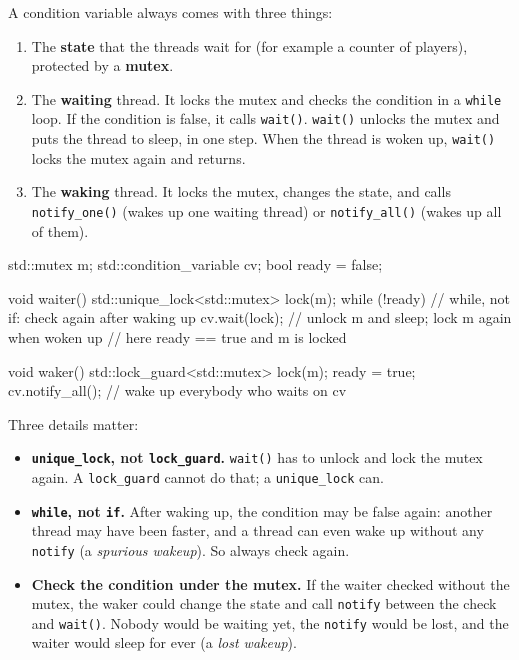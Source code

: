 A condition variable always comes with three things:

\begin{enumerate}
  \item The \textbf{state} that the threads wait for (for example a counter of players), protected by a \textbf{mutex}.
  \item The \textbf{waiting} thread. It locks the mutex and checks the condition in a \texttt{while} loop.
        If the condition is false, it calls \texttt{wait()}. \texttt{wait()} unlocks the mutex and puts the thread
        to sleep, in one step. When the thread is woken up, \texttt{wait()} locks the mutex again and returns.
  \item The \textbf{waking} thread. It locks the mutex, changes the state, and calls \texttt{notify\_one()}
        (wakes up one waiting thread) or \texttt{notify\_all()} (wakes up all of them).
\end{enumerate}

\begin{code}
std::mutex m;
std::condition_variable cv;
bool ready = false;

void waiter() {
    std::unique_lock<std::mutex> lock(m);
    while (!ready)          // while, not if: check again after waking up
        cv.wait(lock);      // unlock m and sleep; lock m again when woken up
    // here ready == true and m is locked
}

void waker() {
    std::lock_guard<std::mutex> lock(m);
    ready = true;
    cv.notify_all();        // wake up everybody who waits on cv
}
\end{code}

Three details matter:

\begin{itemize}
  \item \textbf{\texttt{unique\_lock}, not \texttt{lock\_guard}.} \texttt{wait()} has to unlock and lock the mutex again.
        A \texttt{lock\_guard} cannot do that; a \texttt{unique\_lock} can.
  \item \textbf{\texttt{while}, not \texttt{if}.} After waking up, the condition may be false again: another thread
        may have been faster, and a thread can even wake up without any \texttt{notify} (a \emph{spurious wakeup}).
        So always check again.
  \item \textbf{Check the condition under the mutex.} If the waiter checked without the mutex, the waker could change the
        state and call \texttt{notify} between the check and \texttt{wait()}. Nobody would be waiting yet, the
        \texttt{notify} would be lost, and the waiter would sleep for ever (a \emph{lost wakeup}).
\end{itemize}

